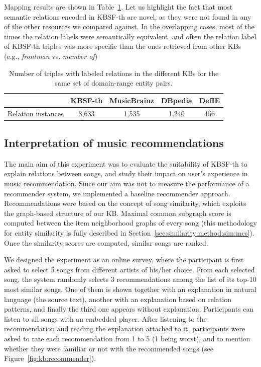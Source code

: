 Mapping results are shown in Table~\ref{tbl:kb:coverage}. Let us highlight the fact that most semantic relations encoded in \textsc{KBSF}-th are novel, as they were not found in any of the other resources we compared against. In the overlapping cases, most of the times the relation labels were semantically equivalent, and often the relation label of \textsc{KBSF}-th triples was more specific than the ones retrieved from other KBs (e.g., \textit{frontman} vs. \textit{member of})

\begin{table}[]
\centering
	\begin{tabular}{ c c c c c }
	\hline
	& KBSF-th & MusicBrainz & DBpedia & DefIE \\
	\hline
	Relation instances & 3,633 & 1,535 & 1,240 & 456 \\
	\hline
	\end{tabular}
	\caption[Number of triples with labeled relations in the different KBs.]{Number of triples with labeled relations in the different KBs for the same set of domain-range entity pairs.}
	\label{tbl:kb:coverage}
\end{table}


\subsection{Interpretation of music recommendations}
\label{sec:kb:experiments:recommendation}

The main aim of this experiment was to evaluate the suitability of \textsc{KBSF}-th to explain relations between songs, and study their impact on user's experience in music recommendation. 
Since our aim was not to measure the performance of a recommender system, we implemented a baseline recommender approach. Recommendations were based on the concept of song similarity, which exploits the graph-based structure of our KB. Maximal common subgraph score is computed between the item neighborhood graphs of every song (this methodology for entity similarity is fully described in Section~\ref{sec:similarity:method:sim:mcs}). Once the similarity scores are computed, similar songs are ranked.


We designed the experiment as an online survey, where the participant is first asked to select 5 songs from different artists of his/her choice. From each selected song, the system randomly selects 3 recommendations among the list of its top-10 most similar songs. One of them is shown together with an explanation in natural language (the source text), another with an explanation based on relation patterns, and finally the third one appears without explanation.
Participants can listen to all songs with an embedded player. After listening to the recommendation and reading the explanation attached to it, participants were asked to rate each recommendation from 1 to 5 (1 being worst), and to mention whether they were familiar or not with the recommended songs (see Figure~\ref{fig:kb:recommender}).


